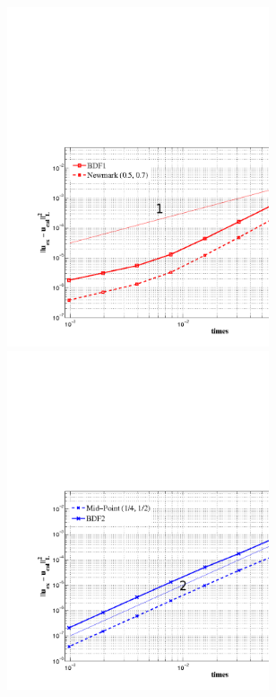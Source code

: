 \documentclass[english,a4paper]{article}
\begin{document}
\begin{figure}[!h]
\centering
\includegraphics[width=8cm, height=10cm]{figures/P21_order1.pdf}
\centering
\includegraphics[width=8cm, height=10cm]{figures/P21_order2.pdf}
\end{figure}
\end{document}
